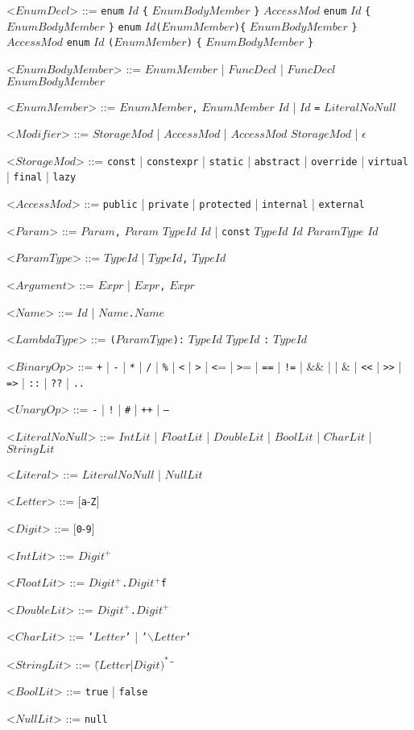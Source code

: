 \documentclass{article}
\newcommand{\gtext}[1]{<$#1$>}
\newcommand{\glit}[1]{\texttt{#1}}
\begin{document}
\begin{grammar}
	\gtext{EnumDecl} ::= \glit{enum} $Id$ \glit{\{} $EnumBodyMember$ \glit{\}}
	\alt $AccessMod$ \glit{enum} $Id$ \glit{\{} $EnumBodyMember$ \glit{\}}
	\alt \glit{enum} $Id$\glit{(}$EnumMember$\glit{)\{} $EnumBodyMember$ \glit{\}}
	\alt $AccessMod$ \glit{enum} $Id$ \glit{(}$EnumMember$\glit{)} \glit{\{} $EnumBodyMember$ \glit{\}}
	
	\gtext{EnumBodyMember} ::= $EnumMember$ | $FuncDecl$ | $FuncDecl$ $EnumBodyMember$
	
	\gtext{EnumMember} ::=  $EnumMember$\glit{,} $EnumMember$
	\alt $Id$ | $Id$ \glit{=} $LiteralNoNull$
	
	\gtext{Modifier} ::= $StorageMod$ | $AccessMod$ | $AccessMod$ $StorageMod$ | $\epsilon$
	
	\gtext{StorageMod} ::= \glit{const} | \glit{constexpr} | \glit{static} | \glit{abstract} | \glit{override} | \glit{virtual} | \glit{final} | \glit{lazy}
	
	\gtext{AccessMod} ::= \glit{public} | \glit{private} | \glit{protected} | \glit{internal} | \glit{external}
	
	\gtext{Param} ::= $Param$\glit{,} $Param$
	\alt $TypeId$ $Id$ | \glit{const} $TypeId$ $Id$
	\alt $ParamType$ $Id$
	
	\gtext{ParamType} ::= $TypeId$ | $TypeId$\glit{,} $TypeId$

	\gtext{Argument} ::= $Expr$ | $Expr$\glit{,} $Expr$
	
	\gtext{Name} ::= $Id$ | $Name$\glit{.}$Name$	
	
	\newpage	
	
	\gtext{LambdaType} ::= \glit{(}$ParamType$\glit{):} $TypeId$
	\alt $TypeId$ \glit{:} $TypeId$
	
	\gtext{BinaryOp} ::= \glit{+} | \glit{-} | \glit{*} | \glit{/} | \glit{\%} | \glit{\textless} | \glit{\textgreater} | \glit{\textless}= | \glit{\textgreater}= | \glit{==} | \glit{!=}
	\alt \glit{\textbar\textbar} | $\&\&$ | \glit{\textbar} | $\&$ | \glit{\textless\textless} | \glit{\textgreater\textgreater} | \glit{=>} | \glit{::} | \glit{??} | \glit{..}
	
	\gtext{UnaryOp} ::= \glit{-} | \glit{!} | \glit{\#} | \glit{++} | \glit{--}
	
	\gtext{LiteralNoNull}	::= $IntLit$ | $FloatLit$ | $DoubleLit$ | $BoolLit$ | $CharLit$ | $StringLit$
	
	\gtext{Literal}	::= $LiteralNoNull$ | $NullLit$
	
	\gtext{Letter} ::= [\glit{a}-\glit{Z}]
	
	\gtext{Digit} ::= [\glit{0}-\glit{9}]
	
	\gtext{IntLit} ::= $Digit^+$
	
	\gtext{FloatLit} ::= $Digit^+$\glit{.}$Digit^+$\glit{f}
	
	\gtext{DoubleLit} ::= $Digit^+$\glit{.}$Digit^+$

	\gtext{CharLit} ::= \glit{'}$Letter$\glit{'} | \glit{'$\backslash$}$Letter$\glit{'}
	
	\gtext{StringLit} ::= \glit{\"}$(Letter$|$Digit)^*$\glit{\"}	
	
	\gtext{BoolLit} ::= \glit{true} | \glit{false}
	
	\gtext{NullLit} ::= \glit{null}

\end{grammar}
\end{document}
